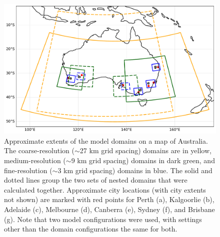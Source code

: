 \documentclass[draft,grl]{agutexSI2019}\usepackage[]{graphicx}\usepackage[]{xcolor}
\begin{document}
\begin{article}
\begin{figure}[!h]
    \includegraphics[width=\textwidth]{figures/domains}
    \caption{Approximate extents of the model domains on a map of Australia. The
    coarse-resolution ($\sim$27 km grid spacing) domains are in yellow,
    medium-resolution ($\sim$9 km grid spacing) domains in dark green, and
    fine-resolution ($\sim$3 km grid spacing) domains in blue. The solid and
    dotted lines group the two sets of nested domains that were calculated
    together. Approximate city locations (with city extents not shown) are
    marked with red points for Perth (a), Kalgoorlie (b), Adelaide (c),
    Melbourne (d), Canberra (e), Sydney (f), and Brisbane (g). Note that two
    model configurations were used, with settings other than the domain
    configurations the same for both.}
    \label{fig:domains}
\end{figure}


\end{article}
\end{document}

